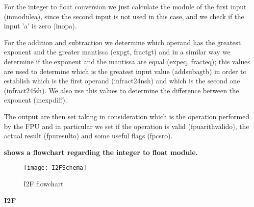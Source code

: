 For the integer to float conversion we just calculate the module of the first input (in\textunderscore module\textunderscore a), since the second input is not used in this case, and we check if the input 'a' is zero (in\textunderscore opa).

For the addition and subtraction we determine which operand has the greatest exponent and the greater mantissa (exp\textunderscore gt, fract\textunderscore gt) and in a similar way we determine if the exponent and the mantissa are equal (exp\textunderscore eq, fract\textunderscore eq); this values are used to determine which is the greatest input value (addsub\textunderscore agtb) in order to establish which is the first operand (in\textunderscore fract24\textunderscore nsh) and which is the second one (in\textunderscore fract24\textunderscore fsh). We also use this values to determine the difference between the exponent (in\textunderscore exp\textunderscore diff).

The output are then set taking in consideration which is the operation performed by the FPU and in particular we set if the operation is valid (fpu\textunderscore arith\textunderscore valid\textunderscore o), the actual result (fpu\textunderscore result\textunderscore o) and some useful flags (fpcsr\textunderscore o).
\newline

\textbf{
 shows a flowchart regarding the integer to float module.}
\newline

\begin{figure}
\centering\texttt{[image: I2FSchema]}
\caption{I2F flowchart}	
\label{fig:i2f_schema}
\end{figure}

\textbf{I2F}
\newline


